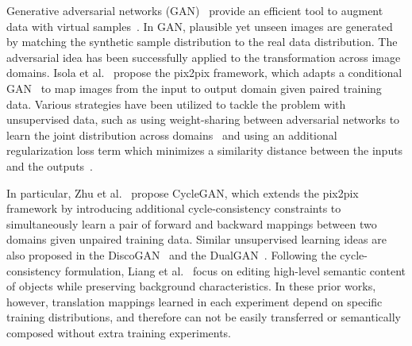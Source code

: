 \documentclass[10pt,twocolumn,letterpaper]{article}
\begin{document}
Generative adversarial networks (GAN)~\cite{GAN} provide an efficient tool to augment data with virtual samples~\cite{RenderGAN, deraining, zizhao}. In GAN, plausible yet unseen images are generated by matching the synthetic sample distribution to the real data distribution. The adversarial idea has been successfully applied to the transformation across image domains. Isola et al.~\cite{pix2pix} propose the pix2pix framework, which adapts a conditional GAN~\cite{cGAN} to map images from the input to output domain given paired training data. Various strategies have been utilized to tackle the problem with unsupervised data, such as using weight-sharing between adversarial networks to learn the joint distribution across domains~\cite{CoGAN, unsup_im2im} and using an additional regularization loss term which minimizes a similarity distance between the inputs and the outputs~\cite{unsup_crossdomain, unsup_pixel, simGAN}. %

In particular, Zhu et al.~\cite{CycleGAN} propose CycleGAN, which extends the pix2pix~\cite{pix2pix} framework by introducing additional cycle-consistency constraints to simultaneously learn a pair of forward and backward mappings between two domains given unpaired training data. Similar unsupervised learning ideas are also proposed in the DiscoGAN~\cite{DiscoGAN} and the DualGAN~\cite{DualGAN}. Following the cycle-consistency formulation, Liang et al.~\cite{ContrastGAN} focus on editing high-level semantic content of objects while preserving background characteristics. In these prior works, however, translation mappings learned in each experiment depend on specific training distributions, and therefore can not be easily transferred or semantically composed without extra training experiments. %
\end{document}
